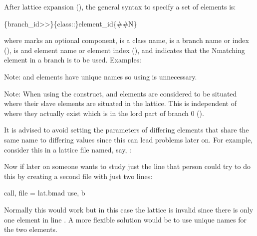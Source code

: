{{{After lattice expansion (), the general syntax to specify a set of elements is:
\begin{example}
  \{branch_id>>\}\{class::\}element_id\{##N\}
\end{example}
where  marks an optional component,  is a class name,  is a
branch name or index (),  is and element name or element index
(), and  indicates that the N\Th matching element in a branch is to be
used. Examples:
Note:  and  elements have unique names so using \vn{\#\#} is unnecessary.

Note: When using the \vn{\#\#} construct,  and  elements are considered 
to be situated where their slave elements are situated in the lattice. This is independent of where
they actually exist which is in the lord part of branch 0 ().

It is advised to avoid setting the parameters of differing elements that share the same
name to differing values since this can lead problems later on. For example, consider this in a
lattice file named, say, :
Now if later on someone wants to study just the  line that person could try to do this by
creating a second file with just two lines:
\begin{example}
  call, file = lat.bmad
  use, b
\end{example}
Normally this would work but in this case the lattice is invalid since there is only one 
element in line . A more flexible solution would be to use unique names for the two 
elements.

}}}
